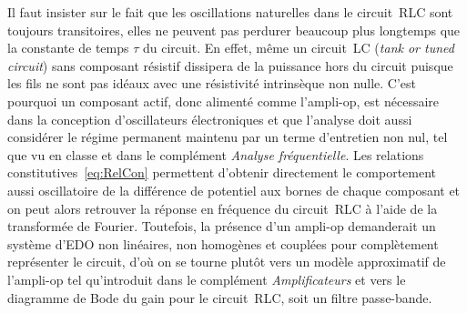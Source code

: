 \documentclass[canadien,12pt,oneside,letterpaper]{article}
\begin{document}


Il faut insister sur le fait que les oscillations naturelles dans le circuit~RLC sont toujours transitoires, elles ne peuvent pas perdurer beaucoup plus longtemps que la constante de temps $\tau$ du circuit. En effet, même un circuit~LC (\textit{tank or tuned circuit}) sans composant résistif dissipera de la puissance hors du circuit puisque les fils ne sont pas idéaux avec une résistivité intrinsèque non nulle. C'est pourquoi un composant actif, donc alimenté comme l'ampli-op, est nécessaire dans la conception d'oscillateurs électroniques et que l'analyse doit aussi considérer le régime permanent maintenu par un terme d'entretien non nul, tel que vu en classe et dans le complément \textit{Analyse fréquentielle}. Les relations constitutives~\eqref{eq:RelCon} permettent d'obtenir directement le comportement aussi oscillatoire de la différence de potentiel aux bornes de chaque composant et on peut alors retrouver la réponse en fréquence du circuit~RLC à l'aide de la transformée de Fourier. Toutefois, la présence d'un ampli-op demanderait un système d'EDO non linéaires, non homogènes et couplées pour complètement représenter le circuit, d'où on se tourne plutôt vers un modèle approximatif de l'ampli-op tel qu'introduit dans le complément \textit{Amplificateurs} et vers le diagramme de Bode du gain pour le circuit~RLC, soit un filtre passe-bande. 


\end{document}

